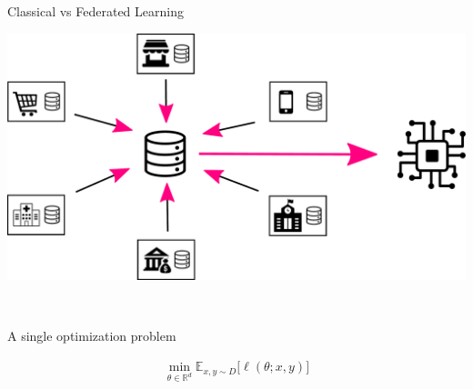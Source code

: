 \documentclass[aspectratio=169,14pt]{beamer}
\begin{document}
\begin{frame}{Classical vs Federated Learning}
  
  \begin{minipage}{0.4\linewidth}
    \begin{center}
      \includegraphics[width=\linewidth]{images/centralize-data.pdf}
    \end{center}
    
  \end{minipage}~~~~%
  \begin{minipage}{0.5\linewidth}
    \begin{center}
      A single optimization problem      
    \end{center}
    \begin{align*}
      \min_{\theta \in \mathbb{R}^d} \mathbb{E}_{x, y \sim D} \Big[ \ell( \theta; x, y ) \Big]
    \end{align*}
    
  \end{minipage}

\end{frame}
\end{document}
